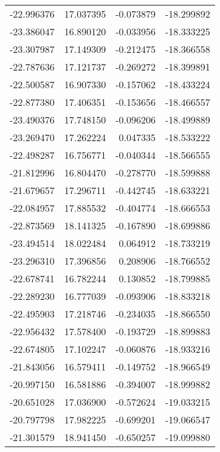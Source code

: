 \begin{tabular}{rrrr}
      -22.996376 &        17.037395 &   -0.073879 & -18.299892 \\
      -23.386047 &        16.890120 &   -0.033956 & -18.333225 \\
      -23.307987 &        17.149309 &   -0.212475 & -18.366558 \\
      -22.787636 &        17.121737 &   -0.269272 & -18.399891 \\
      -22.500587 &        16.907330 &   -0.157062 & -18.433224 \\
      -22.877380 &        17.406351 &   -0.153656 & -18.466557 \\
      -23.490376 &        17.748150 &   -0.096206 & -18.499889 \\
      -23.269470 &        17.262224 &    0.047335 & -18.533222 \\
      -22.498287 &        16.756771 &   -0.040344 & -18.566555 \\
      -21.812996 &        16.804470 &   -0.278770 & -18.599888 \\
      -21.679657 &        17.296711 &   -0.442745 & -18.633221 \\
      -22.084957 &        17.885532 &   -0.404774 & -18.666553 \\
      -22.873569 &        18.141325 &   -0.167890 & -18.699886 \\
      -23.494514 &        18.022484 &    0.064912 & -18.733219 \\
      -23.296310 &        17.396856 &    0.208906 & -18.766552 \\
      -22.678741 &        16.782244 &    0.130852 & -18.799885 \\
      -22.289230 &        16.777039 &   -0.093906 & -18.833218 \\
      -22.495903 &        17.218746 &   -0.234035 & -18.866550 \\
      -22.956432 &        17.578400 &   -0.193729 & -18.899883 \\
      -22.674805 &        17.102247 &   -0.060876 & -18.933216 \\
      -21.843056 &        16.579411 &   -0.149752 & -18.966549 \\
      -20.997150 &        16.581886 &   -0.394007 & -18.999882 \\
      -20.651028 &        17.036900 &   -0.572624 & -19.033215 \\
      -20.797798 &        17.982225 &   -0.699201 & -19.066547 \\
      -21.301579 &        18.941450 &   -0.650257 & -19.099880 \\

\end{tabular}
